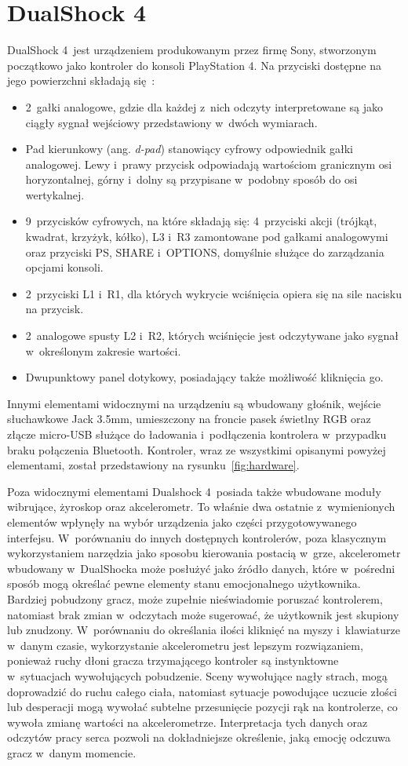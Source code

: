 \section{DualShock 4}
DualShock 4~jest urządzeniem produkowanym przez firmę Sony, stworzonym początkowo jako kontroler do konsoli PlayStation 4. Na przyciski dostępne na jego powierzchni składają się~\cite{dualshock_specification}:
\begin{itemize}
	\item 2~gałki analogowe, gdzie dla każdej z~nich odczyty interpretowane są jako ciągły sygnał wejściowy przedstawiony w~dwóch wymiarach.
	\item Pad kierunkowy (ang. \textit{d-pad}) stanowiący cyfrowy odpowiednik gałki analogowej. Lewy i~prawy przycisk odpowiadają wartościom granicznym osi horyzontalnej, górny i~dolny są przypisane w~podobny sposób do osi wertykalnej.
	\item 9~przycisków cyfrowych, na które składają się: 4~przyciski akcji (trójkąt, kwadrat, krzyżyk, kółko), L3 i~R3 zamontowane pod gałkami analogowymi oraz przyciski PS, SHARE i~OPTIONS, domyślnie służące do zarządzania opcjami konsoli.
	\item 2~przyciski L1 i~R1, dla których wykrycie wciśnięcia opiera się na sile nacisku na przycisk.
	\item 2~analogowe spusty L2 i~R2, których wciśnięcie jest odczytywane jako sygnał w~określonym zakresie wartości.
	\item Dwupunktowy panel dotykowy, posiadający także możliwość kliknięcia go.
\end{itemize}
Innymi elementami widocznymi na urządzeniu są wbudowany głośnik, wejście słuchawkowe Jack 3.5mm, umieszczony na froncie pasek świetlny RGB oraz złącze micro-USB służące do ładowania i~podłączenia kontrolera w~przypadku braku połączenia Bluetooth. Kontroler, wraz ze wszystkimi opisanymi powyżej elementami, został przedstawiony na rysunku~\ref{fig:hardware}.

Poza widocznymi elementami Dualshock 4~posiada także wbudowane moduły wibrujące, żyroskop oraz akcelerometr. To właśnie dwa ostatnie z~wymienionych elementów wpłynęły na wybór urządzenia jako części przygotowywanego interfejsu. W~porównaniu do innych dostępnych kontrolerów, poza klasycznym wykorzystaniem narzędzia jako sposobu kierowania postacią w~grze, akcelerometr wbudowany w~DualShocka może posłużyć jako źródło danych, które w~pośredni sposób mogą określać pewne elementy stanu emocjonalnego użytkownika. Bardziej pobudzony gracz, może zupełnie nieświadomie poruszać kontrolerem, natomiast brak zmian w~odczytach może sugerować, że użytkownik jest skupiony lub znudzony. W~porównaniu do określania ilości kliknięć na myszy i~klawiaturze w~danym czasie, wykorzystanie akcelerometru jest lepszym rozwiązaniem, ponieważ ruchy dłoni gracza trzymającego kontroler są instynktowne w~sytuacjach wywołujących pobudzenie. Sceny wywołujące nagły strach, mogą doprowadzić do ruchu całego ciała, natomiast sytuacje powodujące uczucie złości lub desperacji mogą wywołać subtelne przesunięcie pozycji rąk na kontrolerze, co wywoła zmianę wartości na akcelerometrze. Interpretacja tych danych oraz odczytów pracy serca pozwoli na dokładniejsze określenie, jaką emocję odczuwa gracz w~danym momencie.

